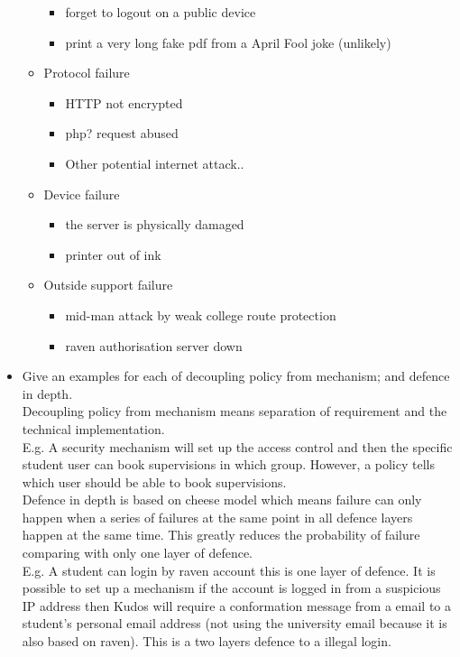 \documentclass[10pt,twoside,a4paper]{article}
\begin{document}
\begin{itemize}
\begin{itemize}
\begin{itemize}
\item forget to logout on a public device
\item print a very long fake pdf from a April Fool joke (unlikely)
\end{itemize}
\item Protocol failure
\begin{itemize}
\item HTTP not encrypted
\item php? request abused
\item Other potential internet attack..
\end{itemize}
\item Device failure
\begin{itemize}
\item the server is physically damaged
\item printer out of ink
\end{itemize}
\item Outside support failure
\begin{itemize}
\item mid-man attack by weak college route protection
\item  raven authorisation server down
\end{itemize}
\end{itemize}
\item
Give an examples for each of decoupling policy from mechanism; and defence in depth.
\\Decoupling policy from mechanism means separation of requirement and the technical implementation.
\\E.g. A security mechanism will set up the access control and then the specific student user can book supervisions in which group. However, a policy tells which user should be able to book supervisions.
\\Defence in depth is based on cheese model which means failure can only happen when a series of failures at the same point in all defence layers happen at the same time. This greatly reduces the probability of failure comparing with only one layer of defence.
\\E.g. A student can login by raven account this is one layer of defence. It is possible to set up a mechanism if the account is logged in from a suspicious IP address then Kudos will require a conformation message from a email to a student's personal email address (not using the university email because it is also based on raven). This is a two layers defence to a illegal login.
\end{itemize}
\end{document}
